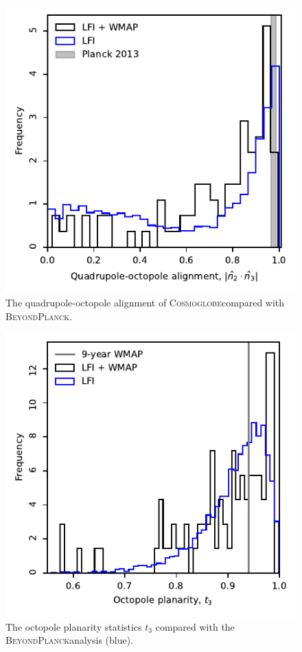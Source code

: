 \documentclass[twocolumn]{../../common/aa}
\newcommand{\BP}{\textsc{BeyondPlanck}}
\newcommand{\Cosmoglobe}{\textsc{Cosmoglobe}}
\begin{document}
\begin{figure}
	\includegraphics[width=\columnwidth]{figures/WMAP_n_2_n_3.pdf}
	\caption{The quadrupole-octopole alignment of \Cosmoglobe compared with \BP.}
\end{figure}

\begin{figure}
	\includegraphics[width=\columnwidth]{figures/WMAP_t_3.pdf}
	\caption{The octopole planarity statistics $t_3$ compared with the \BP analysis (blue).}
\end{figure}
\end{document}

